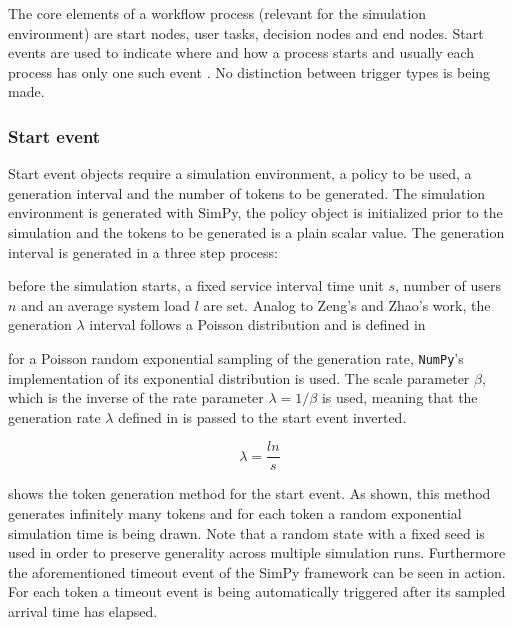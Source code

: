 \documentclass{seal_thesis}
\begin{document}

The core elements of a workflow process (relevant for the simulation environment) are start nodes, user tasks, decision nodes and end nodes. Start events are used to indicate where and how a process starts and usually each process has only one such event \cite[p. 42]{Silver2009}. No distinction between trigger types is being made.

\subsubsection{Start event}

Start event objects require a simulation environment, a policy to be used, a generation interval and the number of tokens to be generated. The simulation environment is generated with SimPy, the policy object is initialized prior to the simulation and the tokens to be generated is a plain scalar value. The generation interval is generated in a three step process:
\begin{enumerate*}
 	\item before the simulation starts, a fixed service interval time unit $s$, number of users $n$ and an average system load $l$ are set. Analog to Zeng's and Zhao's work, the generation $\lambda$ interval follows a Poisson distribution \cite{Zeng2005} and is defined in 
 	\item for a Poisson random exponential sampling of the generation rate, \texttt{NumPy}'s implementation of its exponential distribution is used. The scale parameter $\beta$, which is the inverse of the rate parameter $\lambda = 1/\beta$ is used, meaning that the generation rate $\lambda$ defined in  is passed to the start event inverted.
 \end{enumerate*} 

\begin{equation}
\label{eq:generation_interval}
	\lambda = \frac{l n}{s}
\end{equation}

 shows the token generation method for the start event. As shown, this method generates infinitely many tokens and for each token a random exponential simulation time is being drawn. Note that a random state with a fixed seed is used in order to preserve generality across multiple simulation runs. Furthermore the aforementioned timeout event of the SimPy framework can be seen in action. For each token a timeout event is being automatically triggered after its sampled arrival time has elapsed.
\end{document}

